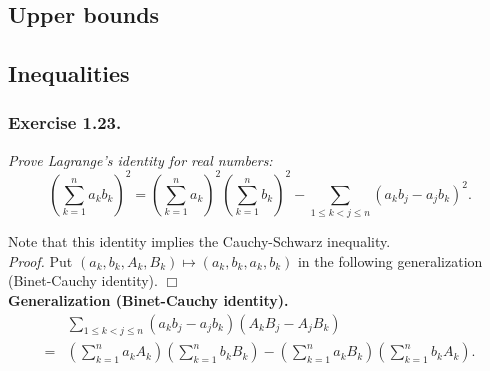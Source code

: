 \documentclass{article}
\begin{document}
\subsection*{Upper bounds \\}






\subsection*{Inequalities \\}



\subsubsection*{Exercise 1.23.}
\emph{Prove Lagrange's identity for real numbers:
$$\left( \sum_{k=1}^{n} a_k b_k \right)^2
= \left( \sum_{k=1}^{n} a_k \right)^2 \left( \sum_{k=1}^{n} b_k \right)^2
- \sum_{1 \leq k < j \leq n}
(a_k b_j - a_j b_k)^2.$$}

Note that this identity implies the Cauchy-Schwarz inequality. \\

\emph{Proof.}
Put $(a_k, b_k, A_k, B_k) \mapsto (a_k, b_k, a_k, b_k)$
in the following generalization (Binet-Cauchy identity).
$\Box$ \\

\textbf{Generalization (Binet-Cauchy identity).}
\begin{align*}
&\sum_{1 \leq k < j \leq n}
(a_k b_j - a_j b_k)(A_k B_j - A_j B_k) \\
= &\left( \sum_{k=1}^{n} a_k A_k \right)\left( \sum_{k=1}^{n} b_k B_k \right)
- \left( \sum_{k=1}^{n} a_k B_k \right)\left( \sum_{k=1}^{n} b_k A_k \right).
\end{align*}
\end{document}
